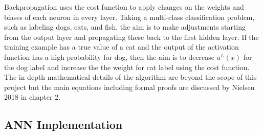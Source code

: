 \documentclass[proposal]{softeng}
\begin{document}
Backpropagation uses the cost function to apply changes on the weights and biases of each neuron in every layer. Taking a multi-class classification problem, such as labeling dogs, cats, and fish, the aim is to make adjustments starting from the output layer and propagating these back to the first hidden layer. If the training example has a true value of a cat and the output of the activation function has a high probability for dog, then the aim is to decrease \( a^L(x) \) for the dog label and increase the the weight for cat label using the cost function. The in depth mathematical details of the algorithm are beyond the scope of this project but the main equations including formal proofs are discussed by Nielsen 2018 \cite{nielsenneural} in chapter 2.

\subsection{ANN Implementation}


















\newpage
\footnotesize




\clearpage
\end{document}
